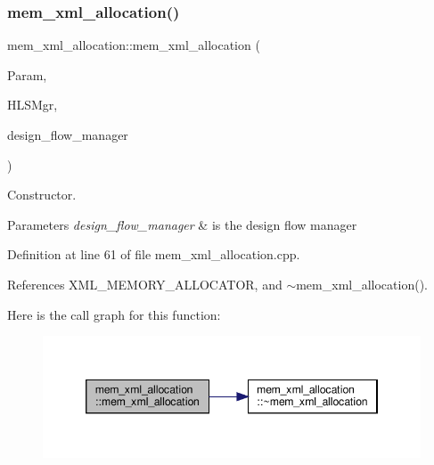 \subsubsection{\texorpdfstring{mem\+\_\+xml\+\_\+allocation()}{mem\_xml\_allocation()}}
{\footnotesize\ttfamily mem\+\_\+xml\+\_\+allocation\+::mem\+\_\+xml\+\_\+allocation (\begin{DoxyParamCaption}\item[{const \hyperlink{Parameter_8hpp_a37841774a6fcb479b597fdf8955eb4ea}{Parameter\+Const\+Ref}}]{Param,  }\item[{const \hyperlink{hls__manager_8hpp_acd3842b8589fe52c08fc0b2fcc813bfe}{H\+L\+S\+\_\+manager\+Ref}}]{H\+L\+S\+Mgr,  }\item[{const Design\+Flow\+Manager\+Const\+Ref}]{design\+\_\+flow\+\_\+manager }\end{DoxyParamCaption})}



Constructor. 


\begin{DoxyParams}{Parameters}
{\em design\+\_\+flow\+\_\+manager} & is the design flow manager \\
\hline
\end{DoxyParams}


Definition at line 61 of file mem\+\_\+xml\+\_\+allocation.\+cpp.



References X\+M\+L\+\_\+\+M\+E\+M\+O\+R\+Y\+\_\+\+A\+L\+L\+O\+C\+A\+T\+OR, and $\sim$mem\+\_\+xml\+\_\+allocation().

Here is the call graph for this function\+:
\nopagebreak
\begin{figure}[H]
\begin{center}
\leavevmode
\includegraphics[width=346pt]{d2/d51/classmem__xml__allocation_aae45922d425552e133c3e71339b54ad0_cgraph}
\end{center}
\end{figure}
\mbox{\label{classmem__xml__allocation_ae7fbf63ff2adab3c7cc127b095f1c225}} 
